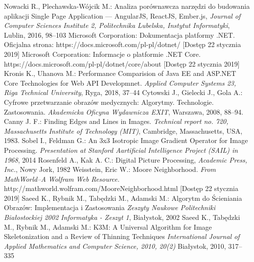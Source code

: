 \documentclass[a4paper,11pt,twoside]{report}
\theoremstyle{definition}
\begin{document}
\begin{thebibliography}{20}%
{}

 Nowacki R., Plechawska-Wójcik M.: Analiza porównawcza narzędzi do budowania aplikacji Single Page Application --- AngularJS, ReactJS, Ember.js, \emph{Journal of Computer Sciences Institute 2, Politechnika Lubelska, Instytut Informatyki}, Lublin, 2016, 98--103
 Microsoft Corporation: Dokumentacja platformy .NET. Oficjalna strona: https://docs.microsoft.com/pl-pl/dotnet/ [Dostęp 22 stycznia 2019]
 Microsoft Corporation: Informacje o platformie .NET Core. https://docs.microsoft.com/pl-pl/dotnet/core/about [Dostęp 22 stycznia 2019]
 Kronis K., Uhanova M.: Performance Comparision of Java EE and ASP.NET Core Technologies for Web API Developmnet. \emph{Applied Computer Systems 23, Riga Technical University}, Ryga, 2018, 37--44
 Cytowski J., Gielecki J., Gola A.: Cyfrowe przetwarzanie obrazów medycznych: Algorytmy. Technologie. Zastosowania. \emph{Akademicka Oficyna Wydawnicza EXIT}, Warszawa, 2008, 88--94.
 Canny J. F.: Finding Edges and Lines in Images. \emph{Technical report no. 720, Massachusetts Institute of Technology (MIT)}, Cambridge, Massachusetts, USA, 1983.
 Sobel I., Feldman G.: An 3x3 Isotropic Image Gradient Operator for Image Processing. \emph {Presentation at Stanford Aartificial Intelligence Project (SAIL) in 1968}, 2014 
 Rosenfeld A., Kak A. C.: Digital Picture Processing, \emph{Academic Press, Inc.}, Nowy Jork, 1982
  Weisstein, Eric W.: Moore Neighborhood. \emph{From MathWorld--A Wolfram Web Resource.} http://mathworld.wolfram.com/MooreNeighborhood.html  [Dostęp 22 stycznia 2019]
 Saeed K., Rybnik M., Tabędzki M., Adamski M.: Algorytm do Ścieniania Obrazów: Implementacja i Zastosowania \emph{Zeszyty Naukowe Politechniki Białostockiej 2002 Informatyka - Zeszyt 1}, Białystok, 2002
 Saeed K., Tabędzki M., Rybnik M., Adamski M.: K3M: A Universal Algorithm for Image Skeletonization and a Review of Thinning Techniques \emph{International Journal of Applied Mathematics and Computer Science, 2010, 20(2)} Białystok, 2010, 317--335

\end{thebibliography}
\end{document}

